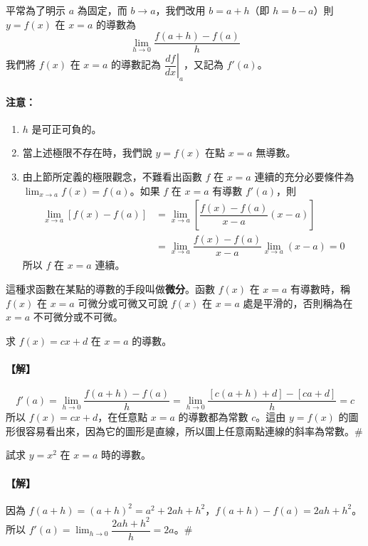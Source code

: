平常為了明示 $a$ 為固定，而 $b\to a$，我們改用 $b=a+h$（即 $h=b-a$）則 $y=f(x)$ 在 $x=a$ 的導數為
\[ \lim_{h\to 0}\dfrac{f(a+h)-f(a)}{h} \]
我們將 $f(x)$ 在 $x=a$ 的導數記為 $\left.\dfrac{df}{dx}\right|_a$，又記為 $f'(a)$。

\paragraph{注意：}
\begin{enumerate}[label=(\roman*), leftmargin=2em]
  \item $h$ 是可正可負的。
  \item 當上述極限不存在時，我們說 $y=f(x)$ 在點 $x=a$ 無導數。
  \item 由上節所定義的極限觀念，不難看出函數 $f$ 在 $x=a$ 連續的充分必要條件為 $\lim_{x\to a}f(x) = f(a)$。如果 $f$ 在 $x=a$ 有導數 $f'(a)$，則
  \begin{align*}
  \lim_{x\to a}[f(x)-f(a)] &= \lim_{x\to a}\left[\dfrac{f(x)-f(a)}{x-a}(x-a)\right] \\
  &= \lim_{x\to a}\dfrac{f(x)-f(a)}{x-a}\lim_{x\to a}(x-a) = 0
  \end{align*}
  所以 $f$ 在 $x=a$ 連續。
\end{enumerate}

這種求函數在某點的導數的手段叫做\textbf{微分}。函數 $f(x)$ 在 $x=a$ 有導數時，稱 $f(x)$ 在 $x=a$ 可微分或可微又可說 $f(x)$ 在 $x=a$ 處是平滑的，否則稱為在 $x=a$ 不可微分或不可微。

\begin{example}\label{ex:b6s-app4-7}
求 $f(x)=cx+d$ 在 $x=a$ 的導數。
\end{example}

\paragraph{【解】}
\[ f'(a) = \lim_{h\to 0}\dfrac{f(a+h)-f(a)}{h} = \lim_{h\to 0}\dfrac{[c(a+h)+d]-[ca+d]}{h} = c \]
所以 $f(x)=cx+d$，在任意點 $x=a$ 的導數都為常數 $c$。這由 $y=f(x)$ 的圖形很容易看出來，因為它的圖形是直線，所以圖上任意兩點連線的斜率為常數。\hfill$\#$

\begin{example}\label{ex:b6s-app4-8}
試求 $y=x^2$ 在 $x=a$ 時的導數。
\end{example}

\paragraph{【解】}
因為 $f(a+h) = (a+h)^2 = a^2+2ah+h^2$，$f(a+h)-f(a) = 2ah+h^2$。
所以 $f'(a) = \lim_{h\to 0}\dfrac{2ah+h^2}{h} = 2a$。\hfill$\#$

